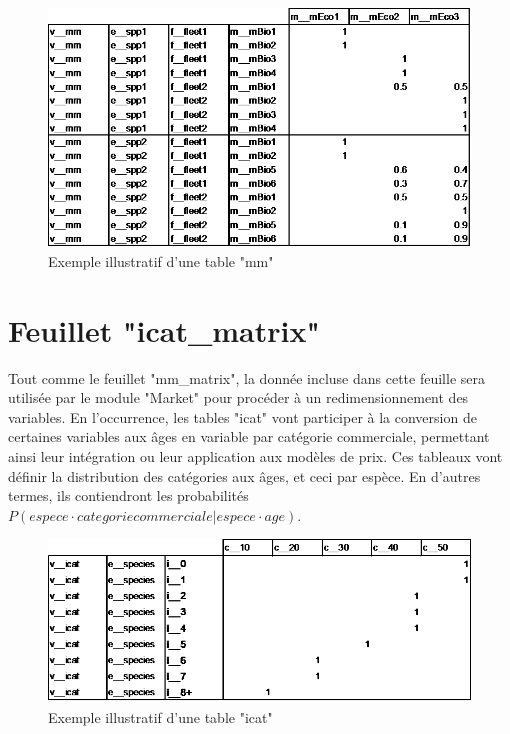 \documentclass[12pt, colorinlistoftodos]{article}
\newenvironment{not used}[1]{%
    \longtable{%
        |>{\centering$\displaystyle}A{#1}{1}<{$}%
        |}\hline\ignorespaces}{%
    \endlongtable\ignorespacesafterend}
\begin{document}
\begin{figure}[h!]
    \begin{center}
    \includegraphics[width = \textwidth]{figures/param/stock10.png}
    \end{center}
    \caption{Exemple illustratif d'une table "mm"}
    \label{fig:mm}
\end{figure}


\section{Feuillet "icat\_matrix"}

Tout comme le feuillet "mm\_matrix", la donnée incluse dans cette feuille sera utilisée par le module "Market" pour procéder à un redimensionnement des variables. En l'occurrence, les tables "icat" vont participer à la conversion de certaines variables aux âges en variable par catégorie commerciale, permettant ainsi leur intégration ou leur application aux modèles de prix. Ces tableaux vont définir la distribution des catégories aux âges, et ceci par espèce. En d'autres termes, ils contiendront les probabilités $P(espece \cdot categorie commerciale| espece \cdot age)$.     

\begin{figure}[h!]
    \begin{center}
    \includegraphics[width = \textwidth]{figures/param/stock11.png}
    \end{center}
    \caption{Exemple illustratif d'une table "icat"}
    \label{fig:icat}
\end{figure}
\end{document}
